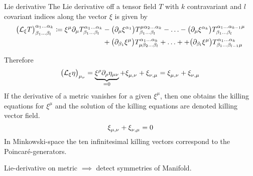 \begin{definition}{Lie derivative}
    The Lie derivative off a tensor field $T$ with $k$ contravariant and $l$ covariant indices along the vector $\xi$ is given by
    \begin{equation}
        \begin{split}
            \left( \liedif{\xi}{T} \right)^{\alpha_1\ldots\alpha_k}_{\beta_1\ldots\beta_l}
            \coloneqq \xi^\mu \partial_\mu T^{\alpha_1\ldots\alpha_k}_{\beta_1\ldots\beta_l}
            & - \left( \partial_\mu \xi^{\alpha_1} \right) T^{\mu\alpha_2\ldots\alpha_k}_{\beta_1\ldots\beta_l} - \ldots
            - \left( \partial_\mu \xi^{\alpha_k} \right) T^{\alpha_1\ldots\alpha_{k-1}\mu}_{\beta_1\ldots\beta_l} \\
            & + \left( \partial_{\beta_1} \xi^\mu \right) T^{\alpha_1\ldots\alpha_k}_{\mu\beta_2\ldots\beta_l} + \ldots
            + + \left( \partial_{\beta_l} \xi^\mu \right) T^{\alpha_1\ldots\alpha_k}_{\beta_1\ldots\beta_{l-1}\mu}
        \end{split}
    \end{equation}
\end{definition}
Therefore
\begin{equation}
    \left( \liedif{\xi}{\eta} \right)_{\mu_\nu} = \underbrace{\xi^\rho\partial_\rho\eta_{\mu\nu}}_{=0}
    + \tensor{\xi}{_\mu_,_\nu} + \tensor{\xi}{_\nu_,_\mu} = \tensor{\xi}{_\mu_,_\nu} + \tensor{\xi}{_\nu_,_\mu}
\end{equation}
If the derivative of a metric vanishes for a given $\xi^\mu$, then one obtains the killing equations for $\xi^\mu$ and the solution of the
killing equations are denoted killing vector field.
\begin{equation}
    \tensor{\xi}{_\mu_,_\nu} + \tensor{\xi}{_\nu_,_\mu}=0  %
\end{equation}
In Minkowski-space the ten infinitesimal killing vectors correspond to the Poincaré-generators.
\begin{sidenote}
Lie-derivative on metric $\implies$ detect symmetries of Manifold.
\end{sidenote}
